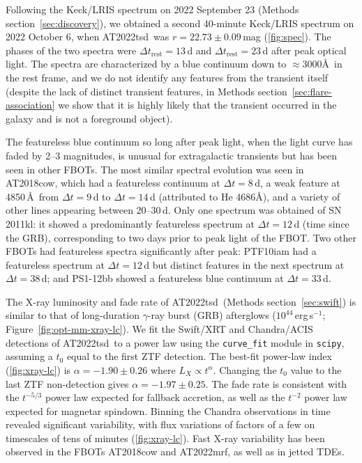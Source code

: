 \documentclass{nature_plusfigure}
\newcommand{\at}{AT2022tsd}
\begin{document}
\begin{methods}
Following the Keck/LRIS spectrum on 2022 September 23 (Methods section~\ref{sec:discovery}), we obtained a second 40-minute Keck/LRIS spectrum on 2022 October 6, when \at\ was $r=22.73\pm0.09\,$mag (\ref{fig:spec}). 
The phases of the two spectra were $\Delta t_\mathrm{rest}=13\,$d and $\Delta t_\mathrm{rest}=23$\,d after peak optical light.
The spectra are characterized by a blue continuum down to $\approx3000$\AA\ in the rest frame, and we do not identify any features from the transient itself (despite the lack of distinct transient features, in Methods section~\ref{sec:flare-association} we show that it is highly likely that the transient occurred in the galaxy and is not a foreground object). 

The featureless blue continuum so long after peak light, when the light curve has faded by 2--3 magnitudes, is unusual for extragalactic transients but has been seen in other FBOTs.
The most similar spectral evolution was seen in AT2018cow\cite{Perley2019}, which had a featureless continuum at $\Delta t=8$\,d, a weak feature at 4850\,\AA\ from $\Delta t=9$\,d to $\Delta t=14$\,d (attributed to He 4686\AA), and a variety of other lines appearing between 20--30\,d. 
Only one spectrum was obtained of SN\,2011kl: it showed a predominantly featureless spectrum at $\Delta t=12$\,d (time since the GRB), corresponding to two days prior to peak light of the FBOT.
Two other FBOTs had featureless spectra significantly after peak: PTF10iam\cite{Arcavi2016} had a featureless spectrum at $\Delta t=12$\,d but distinct features in the next spectrum at $\Delta t=38$\,d; and PS1-12bb\cite{Drout2014} showed a featureless blue continuum at $\Delta t=33$\,d.

The X-ray luminosity and fade rate of \at\ (Methods section~\ref{sec:swift}) is similar to that of long-duration $\gamma$-ray burst (GRB) afterglows ($10^{44}\,$erg\,s$^{-1}$; Figure~\ref{fig:opt-mm-xray-lc}). We fit the Swift/XRT and Chandra/ACIS detections of \at\ to a power law using the \texttt{curve\_fit} module in \texttt{scipy}, assuming a $t_0$ equal to the first ZTF detection. The best-fit power-law index (\ref{fig:xray-lc}) is $\alpha=-1.90\pm0.26$ where $L_X \propto t^{\alpha}$.
Changing the $t_0$ value to the last ZTF non-detection gives $\alpha=-1.97\pm0.25$.
The fade rate is consistent with the $t^{-5/3}$ power law expected for fallback accretion\cite{Phinney1989}, as well as the $t^{-2}$ power law expected for magnetar spindown.
Binning the Chandra observations in time revealed significant variability, with flux variations of factors of a few on timescales of tens of minutes (\ref{fig:xray-lc}). Fast X-ray variability has been observed in the FBOTs AT2018cow\cite{RiveraSandoval2018,Margutti2019,Ho2019} and AT2022mrf\cite{Yao2022}, as well as in jetted TDEs\cite{Zauderer2011}.


\end{methods}
\end{document}
